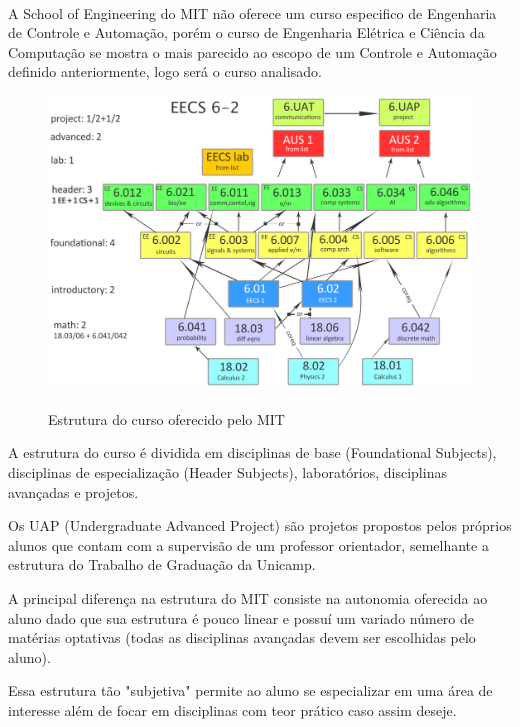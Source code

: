 \documentclass[12pt]{article} %
\begin{document}
\paragraph{} A School of Engineering do MIT não oferece um curso especifico de Engenharia de Controle e Automação, porém o curso de Engenharia Elétrica e Ciência da Computação se mostra o mais parecido ao escopo de um Controle e Automação definido anteriormente, logo será
o curso analisado.

\begin{figure}[H]
\centering
\includegraphics[scale=0.25]{pictures/gradeMIT.png}\\
\caption{Estrutura do curso oferecido pelo MIT}
\end{figure}

A estrutura do curso é dividida em disciplinas de base (Foundational Subjects), disciplinas de especialização (Header Subjects), laboratórios, disciplinas avançadas e projetos.

Os UAP (Undergraduate Advanced Project) são projetos propostos pelos próprios alunos que contam com a supervisão de um professor orientador, semelhante a estrutura do Trabalho de Graduação da Unicamp.

A principal diferença na estrutura do MIT consiste na autonomia oferecida ao aluno dado que sua estrutura é pouco linear e possuí um variado número de matérias optativas (todas as disciplinas avançadas devem ser escolhidas pelo aluno). 

Essa estrutura tão "subjetiva" permite ao aluno se especializar em uma área de interesse além de focar em disciplinas com teor prático caso assim deseje.
\end{document}
